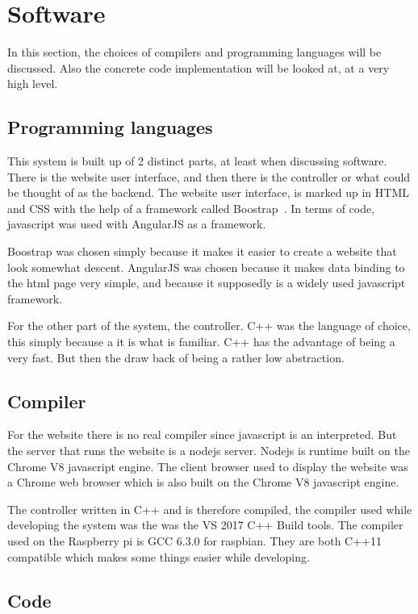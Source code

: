 \section{Software}
In this section, the choices of compilers and programming languages will be discussed. Also the concrete code implementation will be looked at, at a very high level.

\subsection{Programming languages}
This system is built up of 2 distinct parts, at least when discussing software. There is the website user interface, and then there is the controller or what could be thought of as the backend. The website user interface, is marked up in HTML and CSS with the help of a framework called Boostrap~\cite{boostrap}. In terms of code, javascript was used with AngularJS as a framework. 

Boostrap was chosen simply because it makes it easier to create a website that look somewhat descent. AngularJS was chosen because it makes data binding to the html page very simple, and because it supposedly is a widely used javascript framework.

For the other part of the system, the controller. C++ was the language of choice, this simply because a it is what is familiar. C++ has the advantage of being a very fast. But then the draw back of being a rather low abstraction. 
 
\subsection{Compiler}
For the website there is no real compiler since javascript is an interpreted. But the server that runs the website is a nodejs server. Nodejs is runtime built on the Chrome V8 javascript engine. The client browser used to display the website was a Chrome web browser which is also built on the Chrome V8 javascript engine. 

The controller written in C++ and is therefore compiled, the compiler used while developing the system was the was the VS 2017 C++ Build tools. The compiler used on the Raspberry pi is GCC 6.3.0 for raspbian. They are both C++11 compatible which makes some things easier while developing. 

\subsection{Code}

